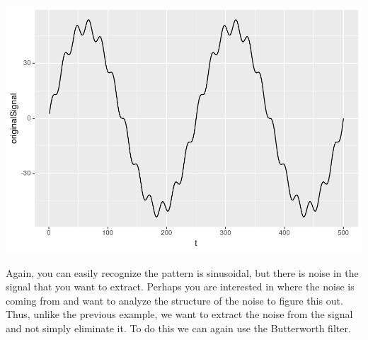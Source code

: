 \documentclass[
]{krantz}
\begin{document}
\includegraphics{bookdown_files/figure-latex/unnamed-chunk-328-1.pdf}

Again, you can easily recognize the pattern is sinusoidal, but there is noise in the signal that you want to extract. Perhaps you are interested in where the noise is coming from and want to analyze the structure of the noise to figure this out. Thus, unlike the previous example, we want to extract the noise from the signal and not simply eliminate it. To do this we can again use the Butterworth filter.
\end{document}
